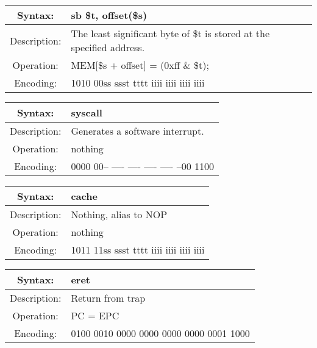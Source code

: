     \begin{table}[!hbp]
    \begin{tabularx}{\textwidth}{|c|X|}
        \hline
        Syntax: & sb \$t, offset(\$s) \\
        \hline
        Description: & The least significant byte of \$t is stored at the specified address. \\
        \hline
        Operation: & MEM[\$s + offset] = (0xff \& \$t); \\
        \hline
        Encoding: & 1010 00ss ssst tttt iiii iiii iiii iiii \\
        \hline
    \end{tabularx}
    \end{table}

    \begin{table}[!hbp]
    \begin{tabularx}{\textwidth}{|c|X|}
        \hline
        Syntax: & syscall \\
        \hline
        Description: & Generates a software interrupt. \\
        \hline
        Operation: & nothing \\
        \hline
        Encoding: & 0000 00-- ---- ---- ---- ---- --00 1100 \\
        \hline
    \end{tabularx}
    \end{table}

    \begin{table}[!hbp]
    \begin{tabularx}{\textwidth}{|c|X|}
        \hline
        Syntax: & cache \\
        \hline
        Description: & Nothing, alias to NOP \\
        \hline
        Operation: & nothing \\
        \hline
        Encoding: & 1011 11ss ssst tttt iiii iiii iiii iiii \\
        \hline
    \end{tabularx}
    \end{table}

\clearpage  %

    \begin{table}[!hbp]
    \begin{tabularx}{\textwidth}{|c|X|}
        \hline
        Syntax: & eret \\
        \hline
        Description: & Return from trap \\
        \hline
        Operation: & PC = EPC \\
        \hline
        Encoding: & 0100 0010 0000 0000 0000 0000 0001 1000 \\
        \hline
    \end{tabularx}
    \end{table}

